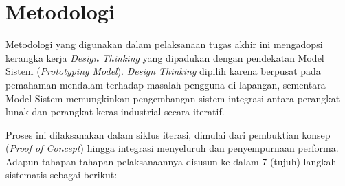 \section{Metodologi}
Metodologi yang digunakan dalam pelaksanaan tugas akhir ini mengadopsi kerangka kerja \textit{Design Thinking} yang dipadukan dengan pendekatan Model Sistem (\textit{Prototyping Model}). \textit{Design Thinking} dipilih karena berpusat pada pemahaman mendalam terhadap masalah pengguna di lapangan, sementara Model Sistem memungkinkan pengembangan sistem integrasi antara perangkat lunak dan perangkat keras industrial secara iteratif. 

Proses ini dilaksanakan dalam siklus iterasi, dimulai dari pembuktian konsep (\textit{Proof of Concept}) hingga integrasi menyeluruh dan penyempurnaan performa. Adapun tahapan-tahapan pelaksanaannya disusun ke dalam 7 (tujuh) langkah sistematis sebagai berikut:

